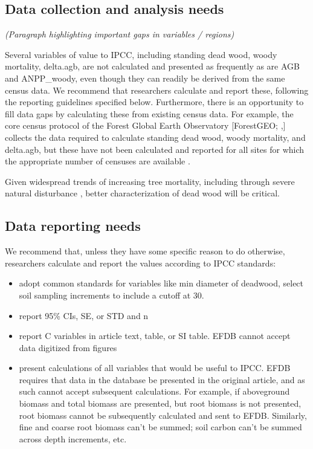 \documentclass[, manuscript]{copernicus}
\begin{document}
\subsection{Data collection and analysis needs}

\emph{(Paragraph highlighting important gaps in variables / regions)}

Several variables of value to IPCC, including standing dead wood, woody
mortality, delta.agb, are not calculated and presented as frequently as
are AGB and ANPP\_woody, even though they can readily be derived from
the same census data. We recommend that researchers calculate and report
these, following the reporting guidelines specified below. Furthermore,
there is an opportunity to fill data gaps by calculating these from
existing census data. For example, the core census protocol of the
Forest Global Earth Observatory {[}ForestGEO;
\citet{anderson-teixeira_ctfsforestgeo_2015},\citet{davies_forestgeo_2021}{]}
collects the data required to calculate standing dead wood, woody
mortality, and delta.agb, but these have not been calculated and
reported for all sites for which the appropriate number of censuses are
available \citep[but see][\citet{refs}]{piponiot_distribution_2022}.

Given widespread trends of increasing tree mortality\citep{refs},
including through severe natural disturbance \citep{refs}, better
characterization of dead wood will be critical.

\subsection{Data reporting needs}

We recommend that, unless they have some specific reason to do
otherwise, researchers calculate and report the values according to IPCC
standards:

\begin{itemize}
\item
  adopt common standards for variables like min diameter of deadwood,
  select soil sampling increments to include a cutoff at 30.
\item
  report 95\% CIs, SE, or STD and n
\item
  report C variables in article text, table, or SI table. EFDB cannot
  accept data digitized from figures
\item
  present calculations of all variables that would be useful to IPCC.
  EFDB requires that data in the database be presented in the original
  article, and as such cannot accept subsequent calculations. For
  example, if aboveground biomass and total biomass are presented, but
  root biomass is not presented, root biomass cannot be subsequently
  calculated and sent to EFDB. Similarly, fine and coarse root biomass
  can't be summed; soil carbon can't be summed across depth increments,
  etc.
\end{itemize}
\end{document}
